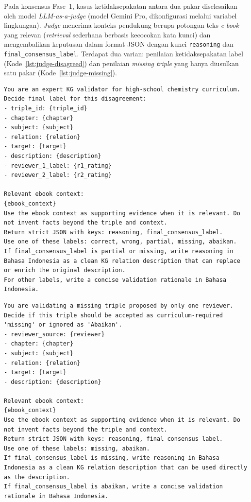 \documentclass[../../thesis]{subfiles}
\begin{document}
Pada konsensus Fase~1, kasus ketidaksepakatan antara dua pakar diselesaikan oleh
model \textit{LLM-as-a-judge} (model Gemini Pro, dikonfigurasi melalui variabel
lingkungan). \textit{Judge} menerima konteks pendukung berupa potongan teks
\textit{e-book} yang relevan (\textit{retrieval} sederhana berbasis kecocokan
kata kunci) dan mengembalikan keputusan dalam format JSON dengan kunci
\texttt{reasoning} dan \texttt{final\_consensus\_label}. Terdapat dua varian:
penilaian ketidaksepakatan label (Kode~\ref{lst:judge-disagreed}) dan penilaian
\textit{missing triple} yang hanya diusulkan satu pakar (Kode~\ref{lst:judge-missing}).

\begin{lstlisting}[style=promptbox,caption={Prompt judge untuk ketidaksepakatan label rating.},label={lst:judge-disagreed}]
You are an expert KG validator for high-school chemistry curriculum.
Decide final label for this disagreement:
- triple_id: {triple_id}
- chapter: {chapter}
- subject: {subject}
- relation: {relation}
- target: {target}
- description: {description}
- reviewer_1_label: {r1_rating}
- reviewer_2_label: {r2_rating}

Relevant ebook context:
{ebook_context}
Use the ebook context as supporting evidence when it is relevant. Do not invent facts beyond the triple and context.
Return strict JSON with keys: reasoning, final_consensus_label.
Use one of these labels: correct, wrong, partial, missing, abaikan.
If final_consensus_label is partial or missing, write reasoning in Bahasa Indonesia as a clean KG relation description that can replace or enrich the original description.
For other labels, write a concise validation rationale in Bahasa Indonesia.
\end{lstlisting}

\begin{lstlisting}[style=promptbox,caption={Prompt judge untuk missing triple yang diusulkan satu pakar.},label={lst:judge-missing}]
You are validating a missing triple proposed by only one reviewer.
Decide if this triple should be accepted as curriculum-required 'missing' or ignored as 'Abaikan'.
- reviewer_source: {reviewer}
- chapter: {chapter}
- subject: {subject}
- relation: {relation}
- target: {target}
- description: {description}

Relevant ebook context:
{ebook_context}
Use the ebook context as supporting evidence when it is relevant. Do not invent facts beyond the triple and context.
Return strict JSON with keys: reasoning, final_consensus_label.
Use one of these labels: missing, abaikan.
If final_consensus_label is missing, write reasoning in Bahasa Indonesia as a clean KG relation description that can be used directly as the description.
If final_consensus_label is abaikan, write a concise validation rationale in Bahasa Indonesia.
\end{lstlisting}
\end{document}
